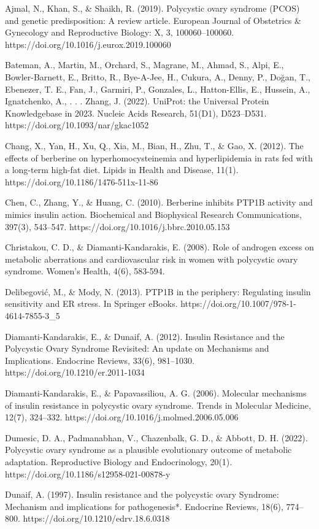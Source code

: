 Ajmal, N., Khan, S., & Shaikh, R. (2019). Polycystic ovary syndrome (PCOS) and genetic predisposition: A review article. European Journal of Obstetrics & Gynecology and Reproductive Biology: X, 3, 100060–100060. https://doi.org/10.1016/j.eurox.2019.100060

Bateman, A., Martin, M., Orchard, S., Magrane, M., Ahmad, S., Alpi, E., Bowler-Barnett, E., Britto, R., Bye-A-Jee, H., Cukura, A., Denny, P., Doğan, T., Ebenezer, T. E., Fan, J., Garmiri, P., Gonzales, L., Hatton-Ellis, E., Hussein, A., Ignatchenko, A., . . . Zhang, J. (2022). UniProt: the Universal Protein Knowledgebase in 2023. Nucleic Acids Research, 51(D1), D523–D531. https://doi.org/10.1093/nar/gkac1052

Chang, X., Yan, H., Xu, Q., Xia, M., Bian, H., Zhu, T., & Gao, X. (2012). The effects of berberine on hyperhomocysteinemia and hyperlipidemia in rats fed with a long-term high-fat diet. Lipids in Health and Disease, 11(1). https://doi.org/10.1186/1476-511x-11-86

Chen, C., Zhang, Y., & Huang, C. (2010). Berberine inhibits PTP1B activity and mimics insulin action. Biochemical and Biophysical Research Communications, 397(3), 543–547. https://doi.org/10.1016/j.bbrc.2010.05.153

Christakou, C. D., & Diamanti-Kandarakis, E. (2008). Role of androgen excess on metabolic aberrations and cardiovascular risk in women with polycystic ovary syndrome. Women’s Health, 4(6), 583-594.

Delibegović, M., & Mody, N. (2013). PTP1B in the periphery: Regulating insulin sensitivity and ER stress. In Springer eBooks. https://doi.org/10.1007/978-1-4614-7855-3\_5

Diamanti-Kandarakis, E., & Dunaif, A. (2012). Insulin Resistance and the Polycystic Ovary Syndrome Revisited: An update on Mechanisms and Implications. Endocrine Reviews, 33(6), 981–1030. https://doi.org/10.1210/er.2011-1034

Diamanti-Kandarakis, E., & Papavassiliou, A. G. (2006). Molecular mechanisms of insulin resistance in polycystic ovary syndrome. Trends in Molecular Medicine, 12(7), 324–332. https://doi.org/10.1016/j.molmed.2006.05.006

Dumesic, D. A., Padmanabhan, V., Chazenbalk, G. D., & Abbott, D. H. (2022). Polycystic ovary syndrome as a plausible evolutionary outcome of metabolic adaptation. Reproductive Biology and Endocrinology, 20(1). https://doi.org/10.1186/s12958-021-00878-y

Dunaif, A. (1997). Insulin resistance and the polycystic ovary Syndrome: Mechanism and implications for pathogenesis*. Endocrine Reviews, 18(6), 774–800. https://doi.org/10.1210/edrv.18.6.0318

